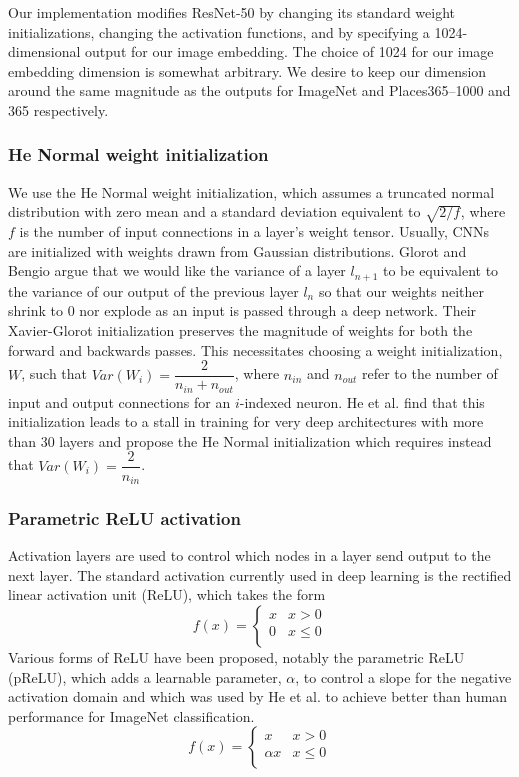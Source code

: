 \documentclass[pageno]{jpaper}
\begin{document}
Our implementation modifies ResNet-50 by changing its standard weight initializations, changing the activation functions, and by specifying a 1024-dimensional output for our image embedding. The choice of 1024 for our image embedding dimension is somewhat arbitrary. We desire to keep our dimension around the same magnitude as the outputs for ImageNet and Places365--1000 and 365 respectively.\\

\subsubsection{He Normal weight initialization}
We use the He Normal weight initialization, which assumes a truncated normal distribution with zero mean and a standard deviation equivalent to $\sqrt{2 / f}$, where $f$ is the number of input connections in a layer's weight tensor. Usually, CNNs are initialized with weights drawn from Gaussian distributions. Glorot and Bengio argue that we would like the variance of a layer $l_{n+1}$ to be equivalent to the variance of our output of the previous layer $l_{n}$ so that our weights neither shrink to 0 nor explode as an input is passed through a deep network.\cite{glorot2010understanding} Their Xavier-Glorot initialization preserves the magnitude of weights for both the forward and backwards passes. This necessitates choosing a weight initialization, $W$, such that $Var(W_i) = \dfrac{2}{n_{in}+n_{out}}$, where $n_{in}$ and $n_{out}$ refer to the number of input and output connections for an $i$-indexed neuron. He et al. find that this initialization leads to a stall in training for very deep architectures with more than 30 layers and propose the He Normal initialization which requires instead that $Var(W_i) = \dfrac{2}{n_{in}}$.\cite{he2015delving}\\

\subsubsection{Parametric ReLU activation}
Activation layers are used to control which nodes in a layer send output to the next layer. The standard activation currently used in deep learning is the rectified linear activation unit (ReLU), which takes the form
\begin{equation}
	f(x) = \begin{cases}
	   x & x > 0 \\
	   0 & x\leq 0 \\
     \end{cases}
\end{equation}
Various forms of ReLU have been proposed, notably the parametric ReLU (pReLU), which adds a learnable parameter, $\alpha$, to control a slope for the negative activation domain and which was used by He et al. to achieve better than human performance for ImageNet classification.\cite{he2016deep}
\begin{equation}
	f(x) = \begin{cases}
	   x & x > 0 \\
	   \alpha x & x \leq 0 \\
     \end{cases}
\end{equation} 
\end{document}

